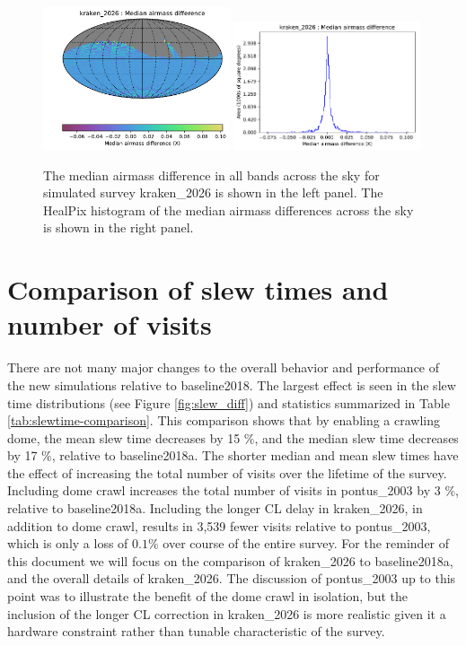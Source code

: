 \documentclass[DM,authoryear,toc]{lsstdoc}
\begin{document}
\begin{figure}[ht]
\centering
\includegraphics[width=0.49\textwidth]{figures/kraken_2026_Median_airmass_difference_HEAL_SkyMap.pdf}
\includegraphics[width=0.49\textwidth]{figures/kraken_2026_Median_airmass_difference_HEAL_Histogram.pdf}
\caption{The median airmass difference  in all bands across the sky for simulated survey
kraken\_2026 is shown in the left panel. The HealPix histogram of the median airmass differences
across the sky is shown in the right panel.}
\label{fig:airmass_diff}
\end{figure}

\section{Comparison of slew times and number of visits}

There are not many major changes to the overall behavior and performance of the new simulations
relative to baseline2018. The largest effect is seen in the slew time distributions (see Figure \ref{fig:slew_diff}) and statistics summarized in
Table \ref{tab:slewtime-comparison}. This comparison shows that by enabling a crawling dome, the mean
slew time decreases by 15 $\%$, and the median slew time decreases by 17 $\%$, relative to baseline2018a.
The shorter median and mean slew times have the effect of increasing the total number of
visits over the lifetime of the survey. Including dome crawl increases the total number of visits in
pontus\_2003 by 3 $\%$, relative to baseline2018a. Including the longer CL delay in kraken\_2026, in addition to
dome crawl, results in 3,539 fewer visits relative to pontus\_2003, which is only a loss of $0.1\%$ over course of the
entire survey. For the reminder of this document we will focus on the comparison of kraken\_2026
to baseline2018a, and the overall details of kraken\_2026. The discussion of pontus\_2003 up to this point was to
illustrate the benefit of the dome crawl in isolation, but the inclusion of the longer CL correction in kraken\_2026 is
more realistic given it a hardware constraint rather than tunable characteristic of the survey.
\end{document}
